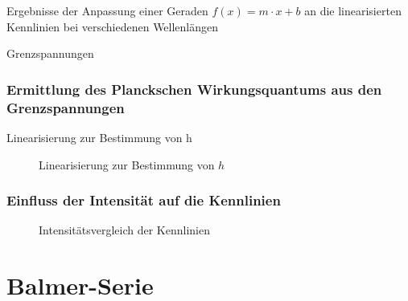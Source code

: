 \documentclass[11pt, a4paper]{article}
\numberwithin{equation}{section}
\begin{document}
\begin{table}[h]
	\centering
	
	\caption{Ergebnisse der Anpassung einer Geraden $f(x) = m \cdot x + b$ an die linearisierten Kennlinien bei verschiedenen Wellenlängen}
	\label{tab:photoeffekt_fit_results}
\end{table}

\begin{table}[h]
	\centering
	
	\caption{Grenzspannungen}
	\label{tab:photoeffekt_grenzspannungen}
\end{table}

\subsubsection{Ermittlung des Planckschen Wirkungsquantums aus den Grenzspannungen}
\begin{table}[h]
	\centering
	
	\caption{Linearisierung zur Bestimmung von h}
	\label{tab:photoeffekt_planck_fitdaten}
\end{table}
\begin{figure}[h]
	\centering
	
	\caption{Linearisierung zur Bestimmung von $h$}
	\label{fig:lin_h}
\end{figure}


\subsubsection{Einfluss der Intensität auf die Kennlinien}
\begin{figure}[h]
	\centering
	
	\caption{Intensitätsvergleich der Kennlinien}
	\label{fig:kennlinie_intensitaet}
\end{figure}

\section{Balmer-Serie}
\end{document}
